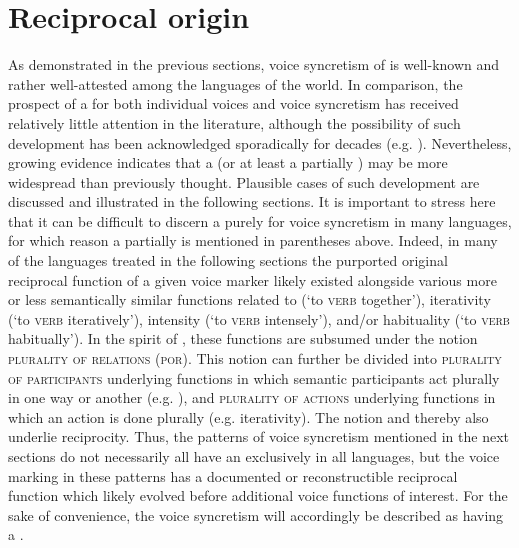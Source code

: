 \section{Reciprocal origin} \label{diachrony:reciprocal}
As demonstrated in the previous sections, voice syncretism of  is well-known and rather well-attested among the languages of the world. In comparison, the prospect of a  for both individual voices and voice syncretism has received relatively little attention in the literature, although the possibility of such development has been acknowledged sporadically for decades (e.g. \citealt[200]{kemmer:1993}). Nevertheless, growing evidence indicates that a  (or at least a partially ) may be more widespread than previously thought. Plausible cases of such development are discussed and illustrated in the following sections. It is important to stress here that it can be difficult to discern a purely  for voice syncretism in many languages, for which reason a partially  is mentioned in parentheses above. Indeed, in many of the languages treated in the following sections the purported original reciprocal function of a given voice marker likely existed alongside various more or less semantically similar functions related to  (‘to \textsc{verb} together’), iterativity (‘to \textsc{verb} iteratively’), intensity (‘to \textsc{verb} intensely’), and/or habituality (‘to \textsc{verb} habitually’). In the spirit of \cite{lichtenberk:1985, lichtenberk:2000}, these functions are subsumed under the notion \textsc{plurality of relations} (\textsc{por}). This notion can further be divided into \textsc{plurality of participants} underlying functions in which semantic participants act plurally in one way or another (e.g. ), and \textsc{plurality of actions} underlying functions in which an action is done plurally (e.g. iterativity). The notion  and thereby  also underlie reciprocity. Thus, the patterns of voice syncretism mentioned in the next sections do not necessarily all have an exclusively  in all languages, but the voice marking in these patterns has a documented or reconstructible reciprocal function which likely evolved before additional voice functions of interest. For the sake of convenience, the voice syncretism will accordingly be described as having a .

